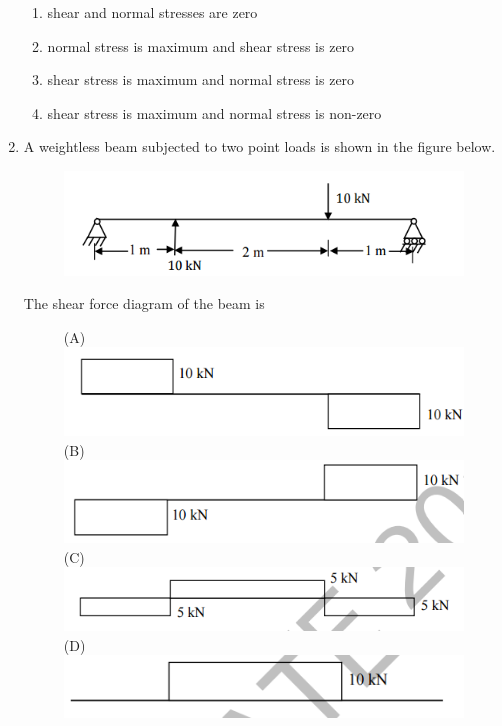 \documentclass[a4paper,10pt]{article}
\begin{document}
\begin{enumerate}
    \hfill{}
    \begin{enumerate}[label=\Alph*)]
        \item shear and normal stresses are zero
        \item normal stress is maximum and shear stress is zero
        \item shear stress is maximum and normal stress is zero
        \item shear stress is maximum and normal stress is non-zero
    \end{enumerate}

    \item A weightless beam subjected to two point loads is shown in the figure below.
    \begin{figure}[H] \centering \includegraphics[width=0.6\columnwidth]{q5_solid.png} \caption*{} \label{fig:q5_solid} \end{figure}
    The shear force diagram of the beam is
    
    \hfill{}
    \begin{figure}[H] \centering \caption*{} \label{fig:q5_solid_options}
        (A) \includegraphics[width=0.5\columnwidth]{q5a_solid.png} \\
        (B) \includegraphics[width=0.5\columnwidth]{q5b_solid.png} \\
        (C) \includegraphics[width=0.5\columnwidth]{q5c_solid.png} \\
        (D) \includegraphics[width=0.5\columnwidth]{q5d_solid.png}
    \end{figure}
    

\end{enumerate}
\end{document}
